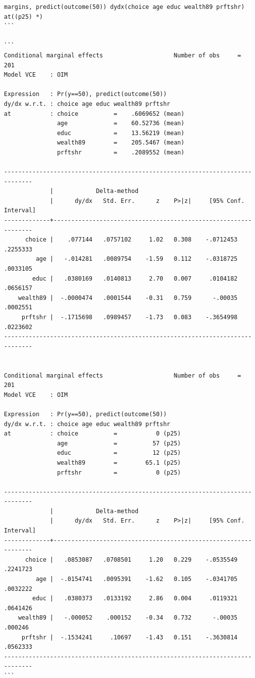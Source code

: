 \documentclass[]{book}
\begin{document}
\begin{verbatim}
margins, predict(outcome(50)) dydx(choice age educ wealth89 prftshr) at((p25) *)
```

```
Conditional marginal effects                    Number of obs     =        201
Model VCE    : OIM

Expression   : Pr(y==50), predict(outcome(50))
dy/dx w.r.t. : choice age educ wealth89 prftshr
at           : choice          =    .6069652 (mean)
               age             =    60.52736 (mean)
               educ            =    13.56219 (mean)
               wealth89        =    205.5467 (mean)
               prftshr         =    .2089552 (mean)

------------------------------------------------------------------------------
             |            Delta-method
             |      dy/dx   Std. Err.      z    P>|z|     [95% Conf. Interval]
-------------+----------------------------------------------------------------
      choice |    .077144   .0757102     1.02   0.308    -.0712453    .2255333
         age |   -.014281   .0089754    -1.59   0.112    -.0318725    .0033105
        educ |   .0380169   .0140813     2.70   0.007     .0104182    .0656157
    wealth89 |  -.0000474   .0001544    -0.31   0.759      -.00035    .0002551
     prftshr |  -.1715698   .0989457    -1.73   0.083    -.3654998    .0223602
------------------------------------------------------------------------------


Conditional marginal effects                    Number of obs     =        201
Model VCE    : OIM

Expression   : Pr(y==50), predict(outcome(50))
dy/dx w.r.t. : choice age educ wealth89 prftshr
at           : choice          =           0 (p25)
               age             =          57 (p25)
               educ            =          12 (p25)
               wealth89        =        65.1 (p25)
               prftshr         =           0 (p25)

------------------------------------------------------------------------------
             |            Delta-method
             |      dy/dx   Std. Err.      z    P>|z|     [95% Conf. Interval]
-------------+----------------------------------------------------------------
      choice |   .0853087   .0708501     1.20   0.229    -.0535549    .2241723
         age |  -.0154741   .0095391    -1.62   0.105    -.0341705    .0032222
        educ |   .0380373   .0133192     2.86   0.004     .0119321    .0641426
    wealth89 |   -.000052    .000152    -0.34   0.732      -.00035     .000246
     prftshr |  -.1534241     .10697    -1.43   0.151    -.3630814    .0562333
------------------------------------------------------------------------------
```



\end{verbatim}
\end{document}
